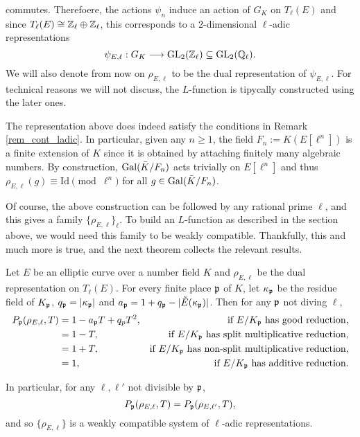 commutes. Therefoere, the actions $\psi_n$ induce an action of $G_K$ on $T_\ell(E)$ and since $T_\ell(E)\cong\mathbb{Z}_\ell\oplus\mathbb{Z}_\ell$, this corresponds to a $2$-dimensional $\ell$-adic representations
$$\psi_{E,\ell}:G_K\longrightarrow \mathrm{GL}_2(\mathbb{Z}_\ell)\subseteq\mathrm{GL}_2(\mathbb{Q}_\ell).$$
We will also denote from now on $\rho_{E,\ell}$ to be the dual representation of $\psi_{E,\ell}$. For technical reasons we will not discuss, the $L$-function is tipycally constructed using the later ones.

\begin{rem}
    The representation above does indeed satisfy the conditions in Remark \ref{rem_cont_ladic}. In particular, given any $n\geq 1$, the field $F_n:=K(E[\ell^n])$ is a finite extension of $K$ since it is obtained by attaching finitely many algebraic numbers. By construction, $\mathrm{Gal}(\bar{K}/F_n)$ acts trivially on $E[\ell^n]$ and thus $\rho_{E,\ell}(g)\equiv \mathrm{Id}\pmod{\ell^n}$ for all $g\in\mathrm{Gal}(\bar{K}/F_n)$.
\end{rem}

Of course, the above construction can be followed by any rational prime $\ell$, and this gives a family $\{\rho_{E,\ell}\}_\ell$. To build an $L$-function as described in the section above, we would need this family to be weakly compatible. Thankfully, this and much more is true, and the next theorem collects the relevant results.

\begin{thm}
    Let $E$ be an elliptic curve over a number field $K$ and $\rho_{E,\ell}$ be the dual representation on $T_\ell(E)$. For every finite place $\mathfrak{p}$ of $K$, let $\kappa_{\mathfrak{p}}$ be the residue field of $K_{\mathfrak{p}}$, $q_{\mathfrak{p}}=|\kappa_{\mathfrak{p}}|$ and $a_{\mathfrak{p}}=1+q_{\mathfrak{p}}-|\tilde{E}(\kappa_{\mathfrak{p}})|$. Then for any $\mathfrak{p}$ not diving $\ell$,
    \begin{align*}
        P_{\mathfrak{p}}(\rho_{E,\ell},T) & = 1-a_{\mathfrak{p}} T+q_p T^2, & \text{if } E/K_{\mathfrak{p}} \text{ has good reduction,}\\
        & = 1-T, & \text{if } E/K_{\mathfrak{p}} \text{ has split multiplicative reduction,}\\
        & = 1+T, & \text{if } E/K_{\mathfrak{p}} \text{ has non-split multiplicative reduction,}\\
        & = 1, & \text{if } E/K_{\mathfrak{p}} \text{ has additive reduction.}
    \end{align*}

    In particular, for any $\ell,\ell'$ not divisible by $\mathfrak{p}$, 
    $$P_{\mathfrak{p}}(\rho_{E,\ell},T)=P_{\mathfrak{p}}(\rho_{E,\ell'},T),$$
    and so $\{\rho_{E,\ell}\}$ is a weakly compatible system of $\ell$-adic representations.
\end{thm}

